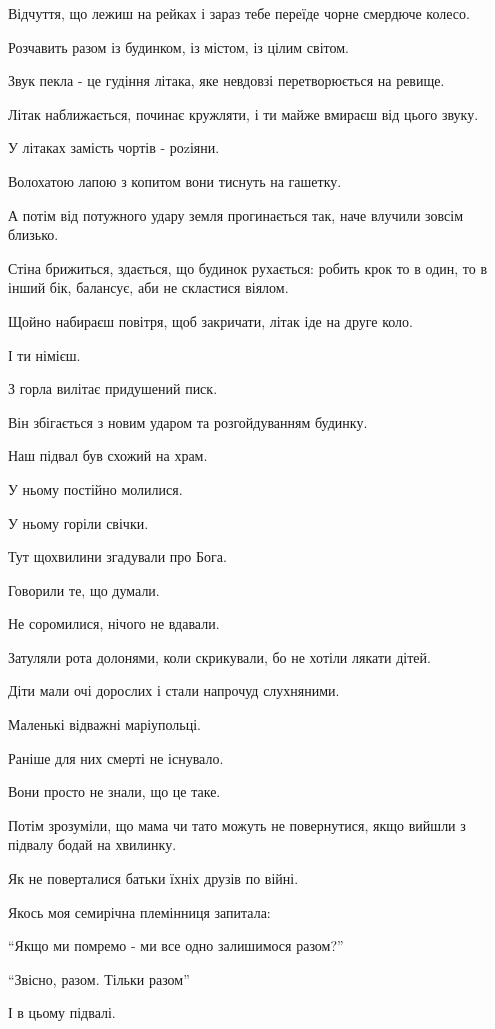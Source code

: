 Відчуття, що лежиш на рейках і зараз тебе переїде чорне смердюче колесо.

Розчавить разом із будинком, із містом, із цілим світом.

Звук пекла - це гудіння літака, яке невдовзі перетворюється на ревище. 

Літак наближається, починає кружляти, і ти майже вмираєш від цього звуку. 

У літаках  замість чортів - роzіяни. 

Волохатою лапою з копитом вони тиснуть на гашетку. 

А потім від потужного удару земля прогинається так, наче влучили зовсім
близько. 

Стіна брижиться, здається, що будинок рухається: робить крок то в один, то в
інший бік, балансує, аби не скластися віялом. 

Щойно набираєш повітря, щоб закричати, літак іде на друге коло.

І ти німієш. 

З горла вилітає придушений писк.

Він збігається з новим ударом та розгойдуванням будинку.

Наш підвал був схожий на храм.

У ньому постійно молилися.

У ньому горіли свічки. 

Тут щохвилини згадували про Бога. 

Говорили те, що думали.

Не соромилися, нічого не вдавали. 

Затуляли рота долонями, коли скрикували, бо не хотіли лякати дітей.

Діти мали очі дорослих і стали напрочуд слухняними.

Маленькі відважні маріупольці.

Раніше для них смерті не існувало. 

Вони просто не знали, що це таке.

Потім зрозуміли, що мама чи тато можуть не повернутися, якщо вийшли з підвалу бодай на хвилинку. 

Як не поверталися батьки їхніх друзів по війні. 

Якось моя семирічна племінниця запитала:

\enquote{Якщо ми помремо - ми все одно залишимося разом?}

\enquote{Звісно, разом. Тільки разом}

І в цьому підвалі.
